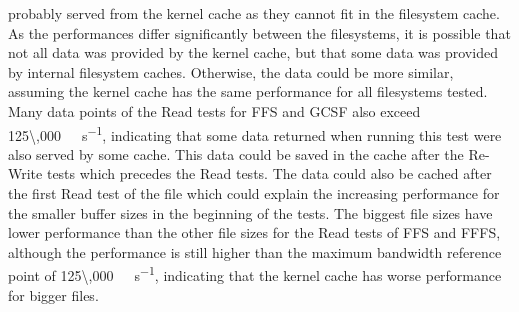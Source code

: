 probably served from the kernel cache as they cannot fit in the filesystem cache. As the performances differ significantly between the filesystems, it is possible that not all data was provided by the kernel cache, but that some data was provided by internal filesystem caches. Otherwise, the data could be more similar, assuming the kernel cache has the same performance for all filesystems tested. Many data points of the Read tests for \gls{FFS} and \gls{GCSF} also exceed \SI[per-mode = symbol]{125\,000}{\kilo\byte\per\second}, indicating that some data returned when running this test were also served by some cache. This data could be saved in the cache after the \mbox{Re-Write} tests which precedes the Read tests. The data could also be cached after the first Read test of the file which could explain the increasing performance for the smaller buffer sizes in the beginning of the tests. The biggest file sizes have lower performance than the other file sizes for the Read tests of \gls{FFS} and \gls{FFFS}, although the performance is still higher than the maximum bandwidth reference point of \SI[per-mode = symbol]{125\,000}{\kilo\byte\per\second}, indicating that the kernel cache has worse performance for bigger files.

